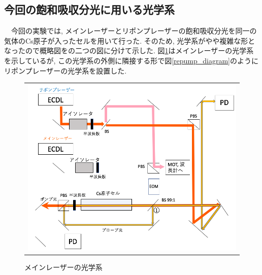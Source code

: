 \documentclass[uplatex, dvipdfmx, a4paper, report, papersize, 11pt]{jsbook}
\begin{document}
\subsection{今回の飽和吸収分光に用いる光学系}
　今回の実験では, メインレーザーとリポンプレーザーの飽和吸収分光を同一の気体のCs原子が入ったセルを用いて行った. そのため, 光学系がやや複雑な形となったので概略図をの二つの図に分けて示した. 図\ref{Main_Laser_diagram}はメインレーザーの光学系を示しているが, この光学系の外側に隣接する形で図\ref{repump_diagram}のようにリポンプレーザーの光学系を設置した.
\begin{figure}[htpb]
  \centering
    \begin{tabular}{c}
      \begin{minipage}{1\hsize}
        \centering
          \includegraphics[keepaspectratio,  scale=0.35,  angle=0]
                          {figures/saturated-absorption/Main_Laser_diagram.png}
                          \caption{メインレーザーの光学系}
                          \label{Main_Laser_diagram}
      \end{minipage}\\


\end{tabular}
\end{figure}
\end{document}
